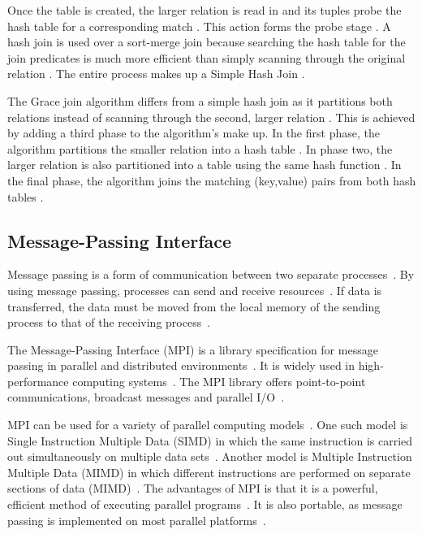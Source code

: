 \documentclass[12pt,twocolumn]{witseiepaper}
\begin{document}
Once the table is created, the larger relation is read in and its tuples probe the hash table for a corresponding match \cite{thomas_zurek_optimisation_1997}. This action forms the probe stage \cite{evaluating4JoinAlgorithms}. A hash join is used over a sort-merge join because searching the hash table for the join predicates is much more efficient than simply scanning through the original relation \cite{evaluating4JoinAlgorithms}. The entire process makes up a Simple Hash Join \cite{evaluating4JoinAlgorithms}. 

The Grace join algorithm differs from a simple hash join as it partitions both relations instead of scanning through the second, larger relation \cite{graceHash}. This is achieved by adding a third phase to the algorithm's make up. In the first phase, the algorithm partitions the smaller relation into a hash table \cite{graceHash}. In phase two, the larger relation is also partitioned into a table using the same hash function \cite{evaluating4JoinAlgorithms}. In the final phase, the algorithm joins the matching (key,value) pairs from both hash tables \cite{evaluating4JoinAlgorithms}.

\subsection{Message-Passing Interface}
Message passing is a form of communication between two separate processes~\cite{IBM, equijoinWithMPI}. By using message passing, processes can send and receive resources~\cite{IBM}. If data is transferred, the data must be moved from the local memory of the sending process to that of the receiving process~\cite{IBM}.

The Message-Passing Interface (MPI) is a library specification for message passing in parallel and distributed environments~\cite{comparingMPIMapReduce}. It is widely used in high-performance computing systems~\cite{equijoinWithMPI, joinOnCluster}. The MPI library offers point-to-point communications, broadcast messages and parallel I/O~\cite{comparingMPIMapReduce}.

MPI can be used for a variety of parallel computing models~\cite{comparingMPIMapReduce}. One such model is Single Instruction Multiple Data (SIMD) in which the same instruction is carried out simultaneously on multiple data sets~\cite{comparingMPIMapReduce}. Another model is Multiple Instruction Multiple Data (MIMD) in which different instructions are performed on separate sections of data (MIMD)~\cite{comparingMPIMapReduce}. The advantages of MPI is that it is a powerful, efficient method of executing parallel programs~\cite{IBM}. It is also portable, as message passing is implemented on most parallel platforms~\cite{IBM}.
\end{document}
